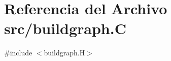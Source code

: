 \hypertarget{buildgraph_8_c}{}\section{Referencia del Archivo src/buildgraph.C}
\label{buildgraph_8_c}
{\ttfamily \#include $<$buildgraph.\+H$>$}\newline
